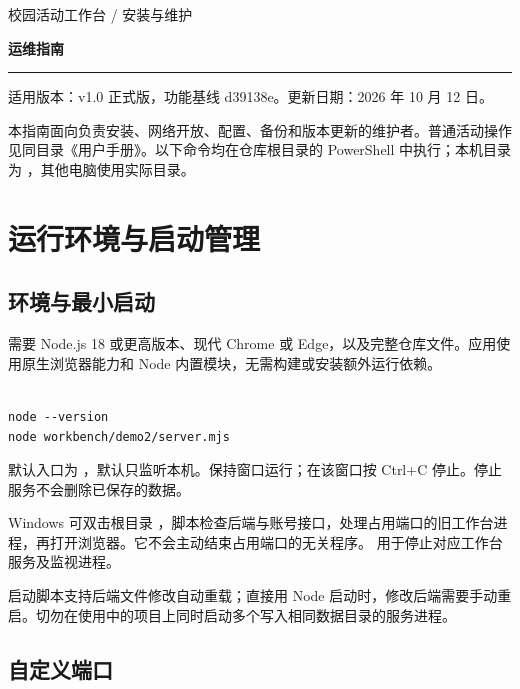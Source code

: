 \documentclass[UTF8,fontset=windows,zihao=-4,a4paper]{ctexart}
\begin{document}
{\small\color{Muted}校园活动工作台 / 安装与维护}\par\vspace{4pt}
{\huge\bfseries\color{Green}运维指南}\par\vspace{5pt}
{\color{Green}\rule{\linewidth}{1.2pt}}\par
适用版本：v1.0 正式版，功能基线 d39138e。更新日期：2026 年 10 月 12 日。


本指南面向负责安装、网络开放、配置、备份和版本更新的维护者。普通活动操作见同目录《用户手册》。以下命令均在仓库根目录的 PowerShell 中执行；本机目录为 ，其他电脑使用实际目录。


\section{运行环境与启动管理}\label{sec:1}

\subsection*{环境与最小启动}

需要 Node.js 18 或更高版本、现代 Chrome 或 Edge，以及完整仓库文件。应用使用原生浏览器能力和 Node 内置模块，无需构建或安装额外运行依赖。



\begin{Verbatim}[fontsize=\small,breaklines=true,breakanywhere=true,frame=single,rulecolor=\color{Rule},framesep=7pt]

node --version
node workbench/demo2/server.mjs

\end{Verbatim}

默认入口为 {\def\UrlBreaks{\do\/}}，默认只监听本机。保持窗口运行；在该窗口按 Ctrl+C 停止。停止服务不会删除已保存的数据。


Windows 可双击根目录 ，脚本检查后端与账号接口，处理占用端口的旧工作台进程，再打开浏览器。它不会主动结束占用端口的无关程序。 用于停止对应工作台服务及监视进程。


启动脚本支持后端文件修改自动重载；直接用 Node 启动时，修改后端需要手动重启。切勿在使用中的项目上同时启动多个写入相同数据目录的服务进程。


\subsection*{自定义端口}
\end{document}
